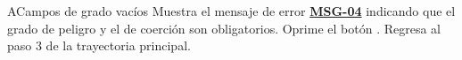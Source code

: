 \begin{UCtrayectoriaA}{A}{Campos de grado vacíos}
	\UCpaso Muestra el mensaje de error \hyperlink{mMSG04}{\bf MSG-04} indicando que el grado de peligro y el de coerción son obligatorios.
	\UCpaso[\UCactor] Oprime el botón .
	\UCpaso Regresa al paso 3 de la trayectoria principal.
\end{UCtrayectoriaA}

